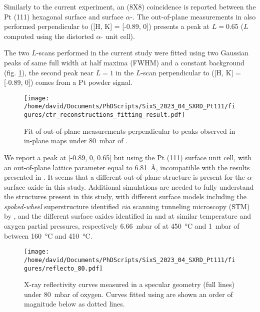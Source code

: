 Similarly to the current experiment, an (8X8) coincidence is reported between the Pt (111) hexagonal surface and surface $\alpha$-.
The out-of-plane measurements in \cite{Ellinger2008} also performed perpendicular to ([H, K] = [-0.89, 0]) presents a peak at $L=0.65$ ($L$ computed using the distorted $\alpha$- unit cell).

The two $L$-scans performed in the current study were fitted using two Gaussian peaks of same full width at half maxima (FWHM) and a constant background (fig. \ref{fig:LScans80Fit}), the second peak near $L=1$ in the $L$-scan perpendicular to ([H, K] = [-0.89, 0]) comes from a Pt powder signal.

\begin{figure}[!htb]
    \centering
    \texttt{[image: /home/david/Documents/PhDScripts/SixS\_2023\_04\_SXRD\_Pt111/figures/ctr\_reconstructions\_fitting\_result.pdf]}
    \caption{
        Fit of out-of-plane measurements perpendicular to peaks observed in in-plane maps under \qty{80}{\milli\bar} of \dioxygen.
    }
    \label{fig:LScans80Fit}
\end{figure}

We report a peak at [-0.89, 0, 0.65] but using the Pt (111) surface unit cell, with an out-of-plane lattice parameter equal to \qty{6.81}{\angstrom}, incompatible with the results presented in \cite{Ellinger2008}.
It seems that a different out-of-plane structure is present for the $\alpha$- surface oxide in this study.
Additional simulations are needed to fully understand the structures present in this study, with different surface models including the \textit{spoked-wheel} superstructure identified \textit{via} scanning tunneling microscopy (STM) by \cite{VanSpronsen2017, Boden2022}, and the different surface oxides identified in \cite{Miller2011,Miller2014} and \cite{Fantauzzi2017, FARKAS2017} at similar temperature and oxygen partial pressures, respectively \qty{6.66}{\milli\bar} of \dioxygen at \qty{450}{\degreeCelsius} and \qty{1}{\milli\bar} of \dioxygen between \qty{160}{\degreeCelsius} and \qty{410}{\degreeCelsius}.

\begin{figure}[!htb]
    \centering
    \texttt{[image: /home/david/Documents/PhDScripts/SixS\_2023\_04\_SXRD\_Pt111/figures/reflecto\_80.pdf]}
    \caption{
    	X-ray reflectivity curves measured in a specular geometry (full lines) under \qty{80}{\milli\bar} of oxygen.
    	Curves fitted using  are shown an order of magnitude below as dotted lines.
    }
    \label{fig:Reflecto80}
\end{figure}

